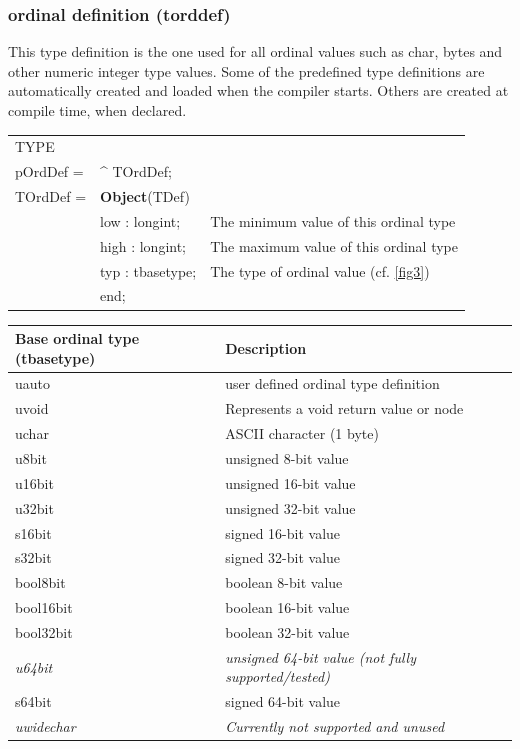 \documentclass [12pt]{article}
\begin{document}
\subsubsection{ordinal definition (torddef)}
\label{subsubsec:ordinal}

This type definition is the one used for all ordinal values such as char, 
bytes and other numeric integer type values. Some of the predefined type 
definitions are automatically created and loaded when the compiler starts. 
Others are created at compile time, when declared.

\begin{tabular*}{6.5in}{|l@{\extracolsep{\fill}}lp{9cm}|}
\hline
\textsf{TYPE} & &  \\
\xspace pOrdDef = & \^{}  TOrdDef; & \\
\xspace \textsf{TOrdDef} = & \textbf{Object}(TDef) & \\
&\textsf{low : longint;}& 
	The minimum value of this ordinal type \\
&\textsf{high : longint;}& 
	The maximum value of this ordinal type \\
&\textsf{typ : tbasetype;}& 
	The type of ordinal value (cf. \ref{fig3}) \\
&\textsf{end;}&  \\
\hline
\end{tabular*}

\begin{longtable}{|l|p{10cm}|}
\hline
Base ordinal type (tbasetype) & Description \\
\hline
\endhead
\hline
\endfoot
\textsf{uauto} & user defined ordinal type definition \\
\textsf{uvoid} & Represents a void return value or node \\
\textsf{uchar} & ASCII character (1 byte) \\
\textsf{u8bit} & unsigned 8-bit value \\
\textsf{u16bit}& unsigned 16-bit value \\
\textsf{u32bit}& unsigned 32-bit value \\
\textsf{s16bit}& signed 16-bit value \\
\textsf{s32bit}& signed 32-bit value \\
\textsf{bool8bit}& boolean 8-bit value \\
\textsf{bool16bit}& boolean 16-bit value \\
\textsf{bool32bit}& boolean 32-bit value \\
\textsf{\textit{u64bit}}& 
	\textit{unsigned 64-bit value (not fully supported/tested)} \\
\textsf{s64bit}& signed 64-bit value \\\textsf{\textit{uwidechar}}& 
	\textit{Currently not supported and unused} \\
\end{longtable}
\end{document}

